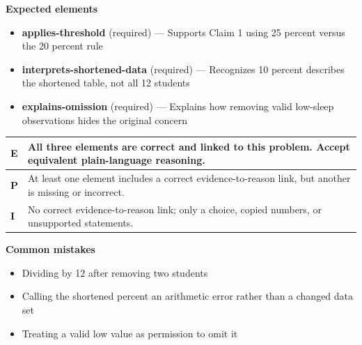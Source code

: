 \documentclass[11pt]{article}
\begin{document}

\textbf{Expected elements}
\begin{itemize}[leftmargin=1.5em,itemsep=2pt,topsep=2pt]
  \item \textbf{applies-threshold} (required) --- Supports Claim 1 using 25 percent versus the 20 percent rule
  \item \textbf{interprets-shortened-data} (required) --- Recognizes 10 percent describes the shortened table, not all 12 students
  \item \textbf{explains-omission} (required) --- Explains how removing valid low-sleep observations hides the original concern
\end{itemize}

{\small\renewcommand{\arraystretch}{1.25}
\noindent\begin{tabular}{|p{0.5in}|p{5.9in}|}
\hline
\textbf{E} & All three elements are correct and linked to this problem. Accept equivalent plain-language reasoning. \\ \hline
\textbf{P} & At least one element includes a correct evidence-to-reason link, but another is missing or incorrect. \\ \hline
\textbf{I} & No correct evidence-to-reason link; only a choice, copied numbers, or unsupported statements. \\ \hline
\end{tabular}}

\textbf{Common mistakes}
\begin{itemize}[leftmargin=1.5em,itemsep=2pt,topsep=2pt]
  \item Dividing by 12 after removing two students
  \item Calling the shortened percent an arithmetic error rather than a changed data set
  \item Treating a valid low value as permission to omit it
\end{itemize}

\clearpage
{}
\end{document}
